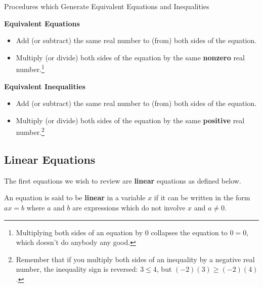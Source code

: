 \begin{floatbox}{Procedures which Generate Equivalent Equations and Inequalities}
\label{box:equivalenteqnineq}

\textbf{Equivalent Equations}
\begin{itemize}

\item  Add (or subtract) the same real number to (from) both sides of the equation.

\item  Multiply (or divide) both sides of the equation by the same \textbf{nonzero} real number.\footnote{Multiplying both sides of an equation by $0$ collapses the equation to $0 = 0$, which doesn't do anybody any good.}

\end{itemize}

\textbf{Equivalent Inequalities}

\begin{itemize}

\item  Add (or subtract) the same real number to (from) both sides of the equation.

\item  Multiply (or divide) both sides of the equation by the same \textbf{positive} real number.\footnote{Remember that if you multiply both sides of an inequality by a negative real number, the inequality sign is reversed:  $3 \leq 4$, but $(-2)(3) \geq (-2)(4)$.}

\end{itemize}

\end{floatbox}

\subsection{Linear Equations} \label{LinearEqn}

The first equations we wish to review are \textbf{linear} equations as defined below.

\begin{tcolorbox}
	
\begin{defn}\label{lineareqndefn} An equation is said to be \textbf{linear} in a variable $x$ if it can be written in the form $ax = b$ where $a$ and $b$ are expressions which do not involve $x$ and $a \neq 0$.

\end{defn}

\end{tcolorbox}


